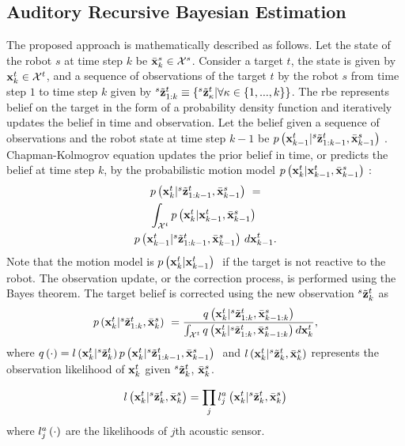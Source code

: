 \documentclass[letterpaper, 10 pt, conference]{ieeeconf}  %
\begin{document}
\subsection{Auditory Recursive Bayesian Estimation}
The proposed approach is mathematically described as follows. Let the state of the robot $s$ at time step $k$ be $\bar {\mathbf{x}}_{k}^{s} \in \mathcal{X}^s$. Consider a target $t$, the state is given by $\mathbf{x}_{k}^{t} \in \mathcal{X}^t$, and a sequence of observations of the target $t$ by the robot $s$ from time step $1$ to time step $k$ given by ${}^{s}\tilde {\mathbf{z}}_{1:k}^{t} \equiv \left \{ {}^{s}\tilde {\mathbf{z}}_{\kappa}^{t}|\forall \kappa \in \left \{ 1,...,k \right \} \right \}$. The \gls{rbe} represents belief on the target in the form of a probability density function and iteratively updates the belief in time and observation.  Let the belief given a sequence of observations and the robot state at time step ${k-1}$ be  $\mbox{$ {p} \left ( \mathbf{x}_{k-1}^{t}|{}^{s}\tilde {\mathbf{z}}_{1:k-1}^{t},\bar {\mathbf{x}}_{k-1}^{s} \right )$ }$. Chapman-Kolmogrov equation updates the prior belief in time, or predicts the belief at time step $k$, by the probabilistic motion model $\mbox{$ {p} \left ( \mathbf{x}_{k}^{t}|\mathbf{x}_{k-1}^{t},\bar {\mathbf{x}}_{k-1}^{s} \right )$ }$: 
\begin{multline}\label{eq:predictT}
\mbox{$ {p} \left ( \mathbf{x}_{k}^{t}|{}^{s}\tilde {\mathbf{z}}_{1:k-1}^{t},\bar {\mathbf{x}}_{k-1}^{s} \right )$ } =\\ \int_{\mathcal{X}^t} \mbox{$ {p} \left ( \mathbf{x}_{k}^{t}|\mathbf{x}_{k-1}^{t},\bar {\mathbf{x}}_{k-1}^{s} \right )$ } \\  \mbox{$ {p} \left ( \mathbf{x}_{k-1}^{t}|{}^{s}\tilde {\mathbf{z}}_{1:k-1}^{t},\bar {\mathbf{x}}_{k-1}^{s} \right )$ } d\mathbf{x}_{k-1}^{t}.
\end{multline}
Note that the motion model is $\mbox{$ {p} \left ( \mathbf{x}_{k}^{t}|\mathbf{x}_{k-1}^{t} \right )$ }$ if the target is not reactive to the robot.  The observation update, or the correction process, is performed using the Bayes theorem.  The target belief is corrected using the new observation ${}^{s}\tilde {\mathbf{z}}_{k}^{t}$ as
\begin{eqnarray}\label{eq:correctT}
\mbox{$ {p} \left ( \mathbf{x}_{k}^{t}|{}^{s}\tilde {\mathbf{z}}_{1:k}^{t},\bar {\mathbf{x}}_{k}^{s} \right )$ } =  \frac{q \left ( \mathbf{x}_{k}^{t}|{}^{s}\tilde {\mathbf{z}}_{1:k}^{t},\bar {\mathbf{x}}_{k-1:k}^{s} \right )} {\int_{\mathcal{X}^t}
    q \left ( \mathbf{x}_{k}^{t}|{}^{s}\tilde {\mathbf{z}}_{1:k}^{t},\bar {\mathbf{x}}_{k-1:k}^{s} \right ) d\mathbf{x}_{k}^{t}},
\end{eqnarray}
where $q \left ( \cdot \right ) = {l \left ( \mathbf{x}_{k}^{t}|{}^{s}\tilde {\mathbf{z}}_{k}^{t} \right ) \mbox{$ {p} \left ( \mathbf{x}_{k}^{t}|{}^{s}\tilde {\mathbf{z}}_{1:k-1}^{t},\bar {\mathbf{x}}_{k-1}^{s} \right )$ }}$ and $l \left ( \mathbf{x}_{k}^{t}|{}^{s}\tilde {\mathbf{z}}_{k}^{t},\bar {\mathbf{x}}_{k}^{s} \right )$ represents the observation likelihood of $\mathbf{x}_{k}^{t}$ given ${}^{s}\tilde {\mathbf{z}}_{k}^{t}$, $\bar {\mathbf{x}}_{k}^{s}$.  

\begin{eqnarray}\label{eq:joint}
l \left ( \mathbf{x}_{k}^{t}|{}^{s}\tilde {\mathbf{z}}_{k}^{t},\bar {\mathbf{x}}_{k}^{s} \right ) =  \prod_j l_j^{a} \left ( \mathbf{x}_{k}^{t}|{}^{s}\tilde {\mathbf{z}}_{k}^{t},\bar {\mathbf{x}}_{k}^{s} \right ) 
\end{eqnarray}
where $l_j^{a} \left ( \cdot \right )$ are the likelihoods of $j$th acoustic sensor.
\end{document}
